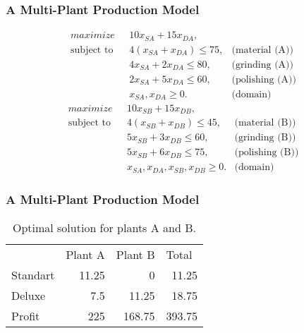 \documentclass[11pt]{beamer}
\begin{document}
\begin{frame}
\frametitle{A Multi-Plant Production Model}


\begin{align}
\displaystyle maximize \mbox{ } & 10x_{SA} + 15x_{DA}, \label{multi1:objective} \\
% 
\mbox{subject to }& 4(x_{SA} + x_{DA}) \leq 75, & \mbox{(material (A))}  \label{multi1:material}\\
& 4x_{SA} + 2x_{DA} \leq 80, & \mbox{(grinding (A))}  \label{multi1:grinding}\\
& 2x_{SA} + 5x_{DA} \leq 60, & \mbox{(polishing (A))}  \label{multi1:polishing}\\
& x_{SA}, x_{DA} \geq 0. & \mbox{(domain)} \label{multi1:domain}
\end{align}
\pause
\begin{align}
\displaystyle maximize \mbox{ } & 10 x_{SB} + 15 x_{DB}, \label{multi2:objective} \\
% 
\mbox{subject to }& 4(x_{SB} + x_{DB}) \leq 45, & \mbox{(material (B))}  \label{multi2:material1}\\
& 5x_{SB} + 3x_{DB} \leq 60, & \mbox{(grinding (B))}  \label{multi2:grinding1}\\
& 5x_{SB} + 6x_{DB} \leq 75, & \mbox{(polishing (B))}  \label{multi2:polishing1}\\
& x_{SA}, x_{DA}, x_{SB}, x_{DB} \geq 0. & \mbox{(domain)} \label{multi2:domain}
\end{align}
\end{frame}
\begin{frame}
\frametitle{A Multi-Plant Production Model}
\begin{table}[htbp]
  \centering
  \caption{Optimal solution for plants A and B.}
    \begin{tabular}{lrrr}
          & \multicolumn{1}{l}{Plant A} & \multicolumn{1}{l}{Plant B} & \multicolumn{1}{l}{Total} \\
    Standart & 11.25 & 0     & 11.25 \\
    Deluxe & 7.5   & 11.25 & 18.75 \\
    \hline
    Profit & 225   & 168.75 & 393.75 \\
    \end{tabular}%
  \label{tab:addlabel}%
\end{table}%

\end{frame}
\end{document}
